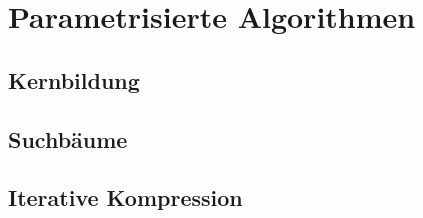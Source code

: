 
\section{Parametrisierte Algorithmen}


\subsection{Kernbildung}


\subsection{Suchbäume}


\subsection{Iterative Kompression}



